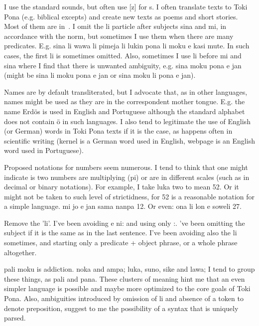 \documentclass{article}
\begin{document}
I use the standard sounds, but often use [z] for s.
I often translate texts to Toki Pona (e.g. biblical excepts)
and create new texts as poems and short stories.
Most of them are in~\cite{tokisona}.
I omit the li particle after subjects sina and mi,
in accordance with the norm,
but sometimes I use them when there are many predicates.
E.g. sina li wawa li pimeja li lukin pona li moku e kasi mute.
In such cases, the first li is sometimes omitted.
Also, sometimes I use li before mi and sina where I find
that there is unwanted ambiguity, e.g.
sina moku pona e jan 
(might be sina li moku pona e jan or sina moku li pona e jan).

Names are by default transliterated,
but I advocate that, as in other languages,
names might be used as they are in the
correspondent mother tongue.
E.g. the name Erdös is used in
English and Portuguese although the standard
alphabet does not contain ö in such languages.
I also tend to legitimate the use of English (or German) words
in Toki Pona texts if it is the case,
as happens often in scientific writing
(kernel is a German word used in English,
webpage is an English word used in Portuguese).

Proposed notations for numbers seem numerous.
I tend to think that one might indicate is two numbers
are multiplying (pi) or are in different scales
(such as in decimal or binary notations).
For example, I take luka two to mean 52.
Or it might not be taken to such level of strictidness,
for 52 is a reasonable notation for a simple language.
mi jo e jan sama nanpa 12.
Or even:
ona li lon e soweli 27.

Remove the 'li'.
I've been avoiding e ni: and using only :.
've been omitting the subject if it is the
same as in the last sentence.
I've been avoiding also the li sometimes,
and starting only a predicate + object phrase,
or a whole phrase altogether.

pali moku is addiction.
noka and ampa; luka, suno, sike and lawa;
I tend to group these things, as pali and pana.
These clusters of meaning hint me that an even simpler
language is possible and maybe more optimized to the
core goals of Toki Pona.
Also, ambiguities introduced by omission of li
and absence of a token to denote preposition,
suggest to me the possibility of a syntax that is uniquely
parsed.
\end{document}
